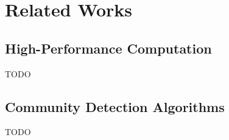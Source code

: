 \section{Related Works}

\subsection{High-Performance Computation}

\par TODO

\subsection{Community Detection Algorithms}

\par TODO

